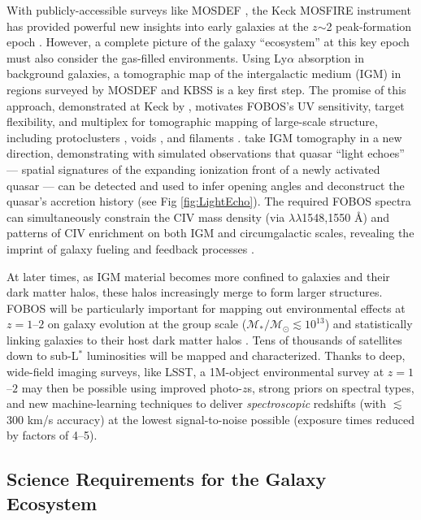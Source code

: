 \documentclass[11pt,a4paper,twoside,onecolumn,openany,final,oldfontcommands]{memoir}
\begin{document}
With publicly-accessible surveys like MOSDEF \citep{kriek15}, the Keck MOSFIRE instrument has provided powerful new insights into early galaxies at the $z$$\sim$2 peak-formation epoch \citep[also see KBSS,][]{steidel14}. However, a complete picture of the galaxy ``ecosystem'' at this key epoch must also consider the gas-filled environments. Using Ly$\alpha$ absorption in background galaxies, a tomographic map of the intergalactic medium (IGM) in regions surveyed by MOSDEF and KBSS is a key first step. The promise of this approach, demonstrated at Keck by \citet{lee14}, motivates FOBOS's UV sensitivity, target flexibility, and multiplex for tomographic mapping of large-scale structure, including protoclusters \citep{lee16,kartaltepe19}, voids \citep{krolewski18}, and filaments \citep{horowitz19}. \citet{2018arXiv181005156S} take IGM tomography in a new direction, demonstrating with simulated observations that quasar ``light echoes'' --- spatial signatures of the expanding ionization front of a newly activated quasar --- can be detected and used to infer opening angles and deconstruct the quasar's accretion history (see Fig \ref{fig:LightEcho}). The required FOBOS spectra can simultaneously constrain the CIV mass density (via $\lambda\lambda$1548,1550 \AA) and patterns of CIV enrichment on both IGM and circumgalactic scales, revealing the imprint of galaxy fueling and feedback processes \citep[e.g.,][]{tumlinson17}.

At later times, as IGM material becomes more confined to galaxies and their dark matter halos, these halos increasingly merge to form larger structures.  FOBOS will be particularly important for mapping out environmental effects at $z=1$--$2$ on galaxy evolution at the group scale ($\mathcal{M_\ast/M_\odot} \lesssim 10^{13}$) and statistically linking galaxies to their host dark matter halos \citep{behroozi19}.  Tens of thousands of satellites down to sub-L$^*$ luminosities will be mapped and characterized. Thanks to deep, wide-field imaging surveys, like LSST, a 1M-object environmental survey at $z=1$--$2$ may then be possible using improved photo-$z$s, strong priors on spectral types, and new machine-learning techniques to deliver {\it spectroscopic} redshifts (with $\lesssim$300 km/s accuracy) at the lowest signal-to-noise possible (exposure times reduced by factors of 4--5).

\subsection{Science Requirements for the Galaxy Ecosystem}
\end{document}
